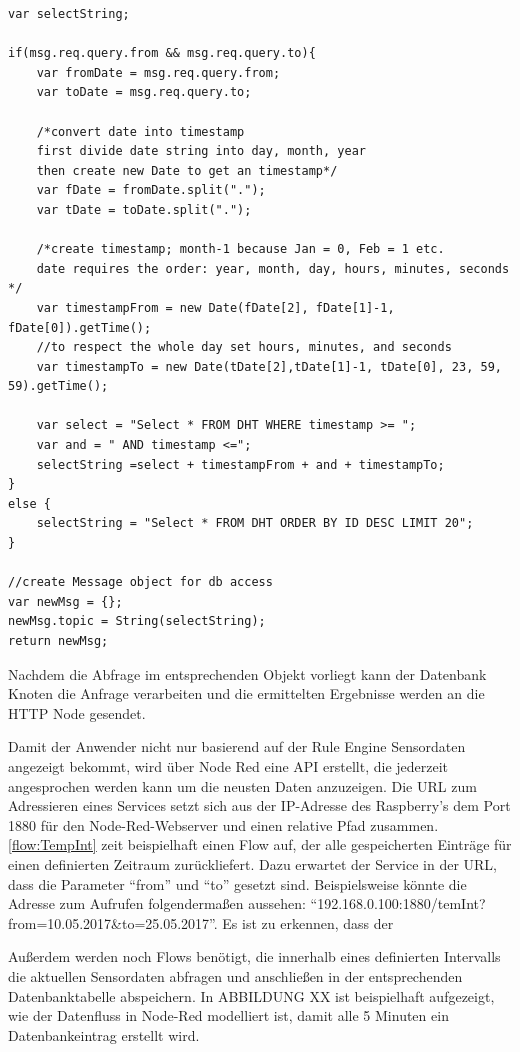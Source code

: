 \begin{lstlisting}[label=list:tempInt, caption={Funktion Node-Red tempInt}]
var selectString;

if(msg.req.query.from && msg.req.query.to){
	var fromDate = msg.req.query.from;
	var toDate = msg.req.query.to;
	
	/*convert date into timestamp
	first divide date string into day, month, year 
	then create new Date to get an timestamp*/
	var fDate = fromDate.split("."); 
	var tDate = toDate.split(".");
	
	/*create timestamp; month-1 because Jan = 0, Feb = 1 etc.
	date requires the order: year, month, day, hours, minutes, seconds */
	var timestampFrom = new Date(fDate[2], fDate[1]-1, fDate[0]).getTime();
	//to respect the whole day set hours, minutes, and seconds
	var timestampTo = new Date(tDate[2],tDate[1]-1, tDate[0], 23, 59, 59).getTime();
	
	var select = "Select * FROM DHT WHERE timestamp >= "; 
	var and = " AND timestamp <=";
	selectString =select + timestampFrom + and + timestampTo;
}
else {
	selectString = "Select * FROM DHT ORDER BY ID DESC LIMIT 20";
}

//create Message object for db access
var newMsg = {};
newMsg.topic = String(selectString);
return newMsg;
\end{lstlisting}

Nachdem die Abfrage im entsprechenden Objekt vorliegt kann der Datenbank Knoten die Anfrage verarbeiten und die ermittelten Ergebnisse werden an die \ac{HTTP} Node gesendet. 

Damit der Anwender nicht nur basierend auf der Rule Engine Sensordaten angezeigt bekommt, wird über Node Red eine \acf{API} erstellt, die jederzeit angesprochen werden kann um die neusten Daten anzuzeigen. Die \ac{URL} zum Adressieren eines Services setzt sich aus der \ac{IP}-Adresse des Raspberry's dem Port 1880 für den Node-Red-Webserver und einen relative Pfad zusammen. 
\\\autoref{flow:TempInt} zeit beispielhaft einen Flow auf, der alle gespeicherten Einträge für einen definierten Zeitraum zurückliefert. Dazu erwartet der Service in der \ac{URL}, dass die Parameter \enquote{from} und \enquote{to} gesetzt sind. Beispielsweise könnte die Adresse zum Aufrufen folgendermaßen aussehen: \enquote{192.168.0.100:1880/temInt?from=10.05.2017\&to=25.05.2017}. Es ist zu erkennen, dass der 



Außerdem werden noch Flows benötigt, die innerhalb eines definierten Intervalls die aktuellen Sensordaten abfragen und anschließen in der entsprechenden Datenbanktabelle abspeichern. In ABBILDUNG XX ist beispielhaft aufgezeigt, wie der Datenfluss in Node-Red modelliert ist, damit alle 5 Minuten ein Datenbankeintrag erstellt wird. 




